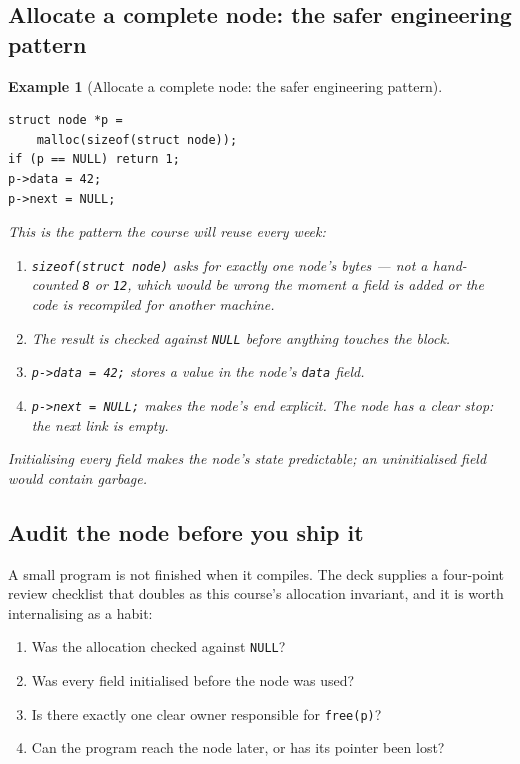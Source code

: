 \documentclass[11pt]{article}
\newtheorem{example}{Example}[section]
\begin{document}
\subsection{Allocate a complete node: the safer engineering pattern}

\begin{example}[Allocate a complete node: the safer engineering pattern]
{\footnotesize
\begin{verbatim}
struct node *p =
    malloc(sizeof(struct node));
if (p == NULL) return 1;
p->data = 42;
p->next = NULL;
\end{verbatim}
}
This is the pattern the course will reuse every week:
\begin{enumerate}
  \item \texttt{sizeof(struct node)} asks for exactly one node's bytes --- not a
    hand-counted \texttt{8} or \texttt{12}, which would be wrong the moment a
    field is added or the code is recompiled for another machine.
  \item The result is checked against \texttt{NULL} before anything touches the
    block.
  \item \texttt{p->data = 42;} stores a value in the node's \texttt{data} field.
  \item \texttt{p->next = NULL;} makes the node's \emph{end} explicit. The node
    has a clear stop: the next link is empty.
\end{enumerate}
Initialising every field makes the node's state predictable; an uninitialised
field would contain garbage.
\end{example}

\subsection{Audit the node before you ship it}

A small program is not finished when it compiles. The deck supplies a four-point
review checklist that doubles as this course's allocation invariant, and it is
worth internalising as a habit:

\begin{enumerate}
  \item Was the allocation checked against \texttt{NULL}?
  \item Was every field initialised before the node was used?
  \item Is there exactly one clear owner responsible for \texttt{free(p)}?
  \item Can the program reach the node later, or has its pointer been lost?
\end{enumerate}
\end{document}

